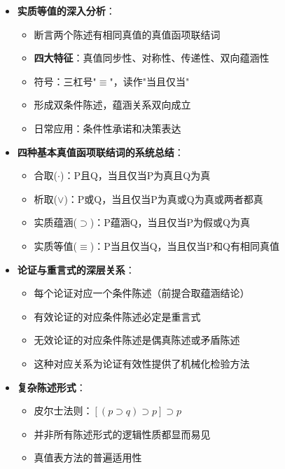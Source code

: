 \begin{center}
{{\begin{itemize}
\item \textbf{实质等值的深入分析}：
  \begin{itemize}
  \item 断言两个陈述有相同真值的真值函项联结词
  \item \textbf{四大特征}：真值同步性、对称性、传递性、双向蕴涵性
  \item 符号：三杠号"$\equiv$"，读作"当且仅当"
  \item 形成双条件陈述，蕴涵关系双向成立
  \item 日常应用：条件性承诺和决策表达
  \end{itemize}
\item \textbf{四种基本真值函项联结词的系统总结}：
  \begin{itemize}
  \item 合取($\cdot$)：P且Q，当且仅当P为真且Q为真
  \item 析取($\vee$)：P或Q，当且仅当P为真或Q为真或两者都真
  \item 实质蕴涵($\supset$)：P蕴涵Q，当且仅当P为假或Q为真
  \item 实质等值($\equiv$)：P当且仅当Q，当且仅当P和Q有相同真值
  \end{itemize}
\item \textbf{论证与重言式的深层关系}：
  \begin{itemize}
  \item 每个论证对应一个条件陈述（前提合取蕴涵结论）
  \item 有效论证的对应条件陈述必定是重言式
  \item 无效论证的对应条件陈述是偶真陈述或矛盾陈述
  \item 这种对应关系为论证有效性提供了机械化检验方法
  \end{itemize}
\item \textbf{复杂陈述形式}：
  \begin{itemize}
  \item 皮尔士法则：$[(p \supset q) \supset p] \supset p$
  \item 并非所有陈述形式的逻辑性质都显而易见
  \item 真值表方法的普遍适用性
  \end{itemize}
\end{itemize}
}}
\end{center}